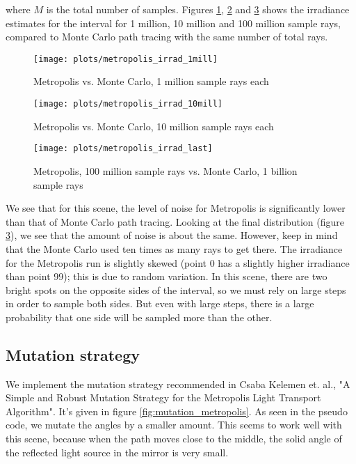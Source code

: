 \documentclass{article} %
\begin{document}
where $M$ is the total number of samples. Figures \ref{fig:metropolis_irrad1}, \ref{fig:metropolis_irrad10} and \ref{fig:metropolis_irrad100} shows the irradiance estimates for the interval for 1 million, 10 million and 100 million sample rays, compared to Monte Carlo path tracing with the same number of total rays.

\begin{figure}[h]
    \centering
    \texttt{[image: plots/metropolis\_irrad\_1mill]}\\
    \caption{Metropolis vs. Monte Carlo, 1 million sample rays each}
    \label{fig:metropolis_irrad1}
\end{figure}

\begin{figure}
    \centering
    \texttt{[image: plots/metropolis\_irrad\_10mill]}\\
    \caption{Metropolis vs. Monte Carlo, 10 million sample rays each}
    \label{fig:metropolis_irrad10}
\end{figure}

\begin{figure}
    \centering
    \texttt{[image: plots/metropolis\_irrad\_last]}\\
    \caption{Metropolis, 100 million sample rays vs. Monte Carlo, 1 billion sample rays}
    \label{fig:metropolis_irrad100}
\end{figure}

We see that for this scene, the level of noise for Metropolis is significantly lower than that of Monte Carlo path tracing. Looking at the final distribution (figure \ref{fig:metropolis_irrad100}), we see that the amount of noise is about the same. However, keep in mind that the Monte Carlo used ten times as many rays to get there. The irradiance for the Metropolis run is slightly skewed (point 0 has a slightly higher irradiance than point 99); this is due to random variation. In this scene, there are two bright spots on the opposite sides of the interval, so we must rely on large steps in order to sample both sides. But even with large steps, there is a large probability that one side will be sampled more than the other.

\subsection*{Mutation strategy}
We implement the mutation strategy recommended in Csaba Kelemen et. al., "A Simple and Robust Mutation Strategy for the Metropolis Light Transport Algorithm". It's given in figure \ref{fig:mutation_metropolis}. As seen in the pseudo code, we mutate the angles by a smaller amount. This seems to work well with this scene, because when the path moves close to the middle, the solid angle of the reflected light source in the mirror is very small.
\end{document}
